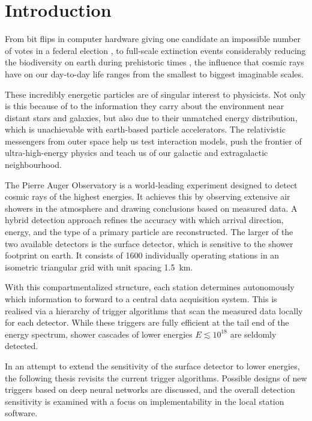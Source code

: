 
\chapter{Introduction}
\label{chap:introduction}


From bit flips in computer hardware giving one candidate an impossible number of votes in a federal election \cite{cosmicraybitshift}, to full-scale extinction 
events considerably reducing the biodiversity on earth  during prehistoric times \cite{melott2004did, fields2020supernova}, the influence that cosmic rays have on
our day-to-day life ranges from the smallest to biggest imaginable scales.

These incredibly energetic particles are of singular interest to physicists. Not only is this because of to the information they carry about the environment near 
distant stars and galaxies, but also due to their unmatched energy distribution, which is unachievable with earth-based particle accelerators. The relativistic 
messengers from outer space help us test interaction models, push the frontier of ultra-high-energy physics and teach us of our galactic and extragalactic 
neighbourhood.

The Pierre Auger Observatory is a world-leading experiment designed to detect cosmic rays of the highest energies. It achieves this by observing extensive air 
showers in the atmosphere and drawing conclusions based on measured data. A hybrid detection approach refines the accuracy with which arrival direction, energy, 
and the type of a primary particle are reconstructed. The larger of the two available detectors is the surface detector, which is sensitive to the shower footprint
on earth. It consists of 1600 individually operating stations in an isometric triangular grid with unit spacing \SI{1.5}{\kilo\meter}.

With this compartmentalized structure, each station determines autonomously which information to forward to a central data acquisition system. This is realised via
a hierarchy of trigger algorithms that scan the measured data locally for each detector. While these triggers are fully efficient at the tail end of the energy 
spectrum, shower cascades of lower energies $E \lesssim 10^{18}$ are seldomly detected. 

In an attempt to extend the sensitivity of the surface detector to lower energies, the following thesis revisits the current trigger algorithms. Possible 
designs of new triggers based on deep neural networks are discussed, and the overall detection sensitivity is examined with a focus on implementability in the 
local station software.

